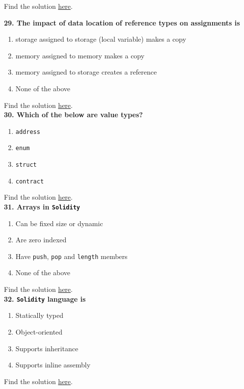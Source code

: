 Find the solution \hyperref[sec:exam2_q28]{here}.\\

\pagebreak

\textbf{29. The impact of data location of reference types on assignments is}

\begin{enumerate}[label=\Alph*.]
    \item storage assigned to storage (local variable) makes a copy
    \item memory assigned to memory makes a copy
    \item memory assigned to storage creates a reference
    \item None of the above
\end{enumerate}

Find the solution \hyperref[sec:exam2_q29]{here}.\\

\textbf{30. Which of the below are value types?}

\begin{enumerate}[label=\Alph*.]
    \item\verb|address|
    \item\verb|enum|
    \item\verb|struct|
    \item\verb|contract|
\end{enumerate}

Find the solution \hyperref[sec:exam2_q30]{here}.\\

\textbf{31. Arrays in \texttt{Solidity}}

\begin{enumerate}[label=\Alph*.]
    \item Can be fixed size or dynamic
    \item Are zero indexed
    \item Have \verb|push|, \verb|pop| and \verb|length| members
    \item None of the above
\end{enumerate}

Find the solution \hyperref[sec:exam2_q31]{here}.\\

\textbf{32. \texttt{Solidity} language is}

\begin{enumerate}[label=\Alph*.]
    \item Statically typed
    \item Object-oriented
    \item Supports inheritance
    \item Supports inline assembly
\end{enumerate}

Find the solution \hyperref[sec:exam2_q32]{here}.\\
